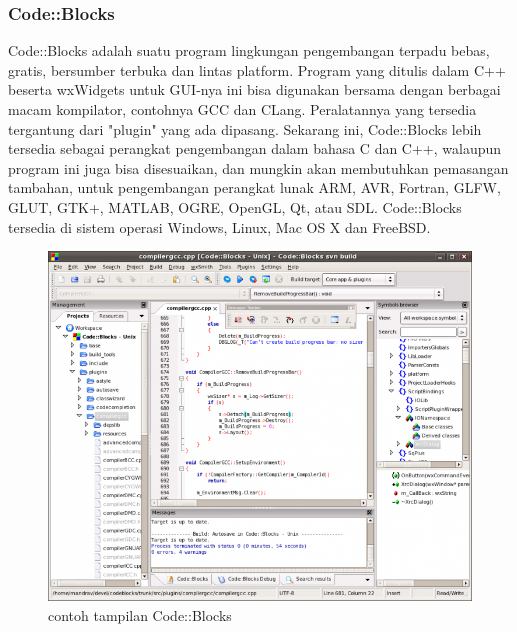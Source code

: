 \documentclass[12pt,]{article}
\begin{document}
	\subsubsection{Code::Blocks}
	Code::Blocks adalah suatu program lingkungan pengembangan terpadu bebas, gratis, bersumber terbuka dan lintas platform.
	Program yang ditulis dalam C++ beserta wxWidgets untuk GUI-nya ini bisa digunakan bersama dengan berbagai macam kompilator, contohnya GCC dan CLang.
	Peralatannya yang tersedia tergantung dari "plugin" yang ada dipasang.
	Sekarang ini, Code::Blocks lebih tersedia sebagai perangkat pengembangan dalam bahasa C dan C++, walaupun program ini juga bisa disesuaikan, 
	dan mungkin akan membutuhkan pemasangan tambahan, untuk pengembangan perangkat lunak ARM, AVR, Fortran, GLFW, GLUT, GTK+,  MATLAB, OGRE, OpenGL, Qt, atau SDL.
	Code::Blocks tersedia di sistem operasi Windows, Linux, Mac OS X dan FreeBSD.
	\begin{figure}[H]
		\centering
		\includegraphics[width=0.6\linewidth]{images/cb}
		\caption{contoh tampilan Code::Blocks}
	\end{figure}
	
\end{document}
